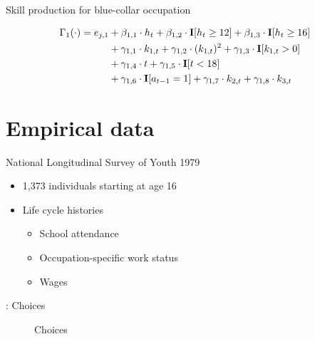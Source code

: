 \begin{frame}{Skill production for blue-collar occupation}\vspace{0.25cm}

\begin{align*}
     \Gamma_1(\cdot) = e_{j,1} & + \beta_{1,1} \cdot h_t + \beta_{1, 2} \cdot {\textbf{I}}[h_t \geq 12] + \beta_{1,3} \cdot {\textbf{I}}[h_t\geq 16]\\
                                   & + \gamma_{1, 1} \cdot  k_{1,t} + \gamma_{1,2} \cdot  (k_{1,t})^2 + \gamma_{1,3} \cdot  {\textbf{I}}[k_{1,t} > 0] \\
                                 & + \gamma_{1,4} \cdot  t + \gamma_{1,5} \cdot {\textbf{I}}[t < 18]\\
                                   & + \gamma_{1,6} \cdot {\textbf{I}}[a_{t-1} = 1] + \gamma_{1,7} \cdot  k_{2,t} + \gamma_{1,8} \cdot  k_{3,t}
\end{align*}
\end{frame}
\section{Empirical data}
\begin{frame}{National Longitudinal Survey of Youth 1979}\vspace{0.25cm}

	\begin{itemize}\setlength\itemsep{1em}
	\item 1,373 individuals starting at age 16
	\item Life cycle histories\medskip
	\begin{itemize}\setlength\itemsep{1em}
		\item School attendance
		\item Occupation-specific work status
		\item Wages
	\end{itemize}
\end{itemize}
\end{frame}
\begin{frame}{\insertsection: Choices}
  \begin{figure}
  \caption{Choices}
  \end{figure}
\end{frame}


